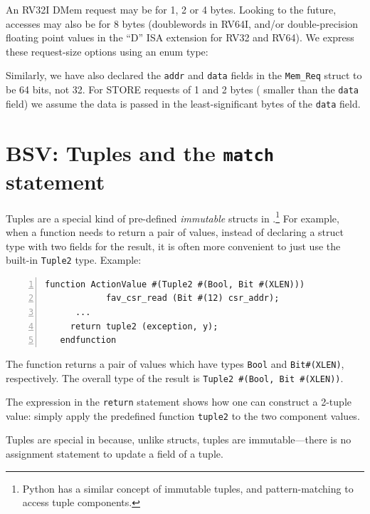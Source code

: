 An RV32I DMem request may be for 1, 2 or 4 bytes.  Looking to the
future, accesses may also be for 8 bytes (doublewords in RV64I, and/or
double-precision floating point values in the ``D'' ISA extension for
RV32 and RV64).  We express these request-size options using an enum
type:


Similarly, we have also declared the \verb|addr| and \verb|data|
fields in the \verb|Mem_Req| struct to be 64 bits, not 32.  For STORE
requests of 1 and 2 bytes ({\ie} smaller than the \verb|data| field)
we assume the data is passed in the least-significant bytes of the
\verb|data| field.


\section{BSV: Tuples and the {\tt match} statement}

\label{Sec_Tuples}


Tuples are a special kind of pre-defined \emph{immutable} structs in
{\BSV}.\footnote{
Python has a similar concept of immutable tuples, and pattern-matching
to access tuple components.
}
For example, when a function needs to return a pair of values, instead
of declaring a struct type with two fields for the result, it is often
more convenient to just use the built-in \verb|Tuple2| type.  Example:

{\footnotesize
\begin{Verbatim}[frame=single, numbers=left, label=in src\_Common/CSRs.bsv]
   function ActionValue #(Tuple2 #(Bool, Bit #(XLEN)))
            fav_csr_read (Bit #(12) csr_addr);
      ...
	 return tuple2 (exception, y);
   endfunction
\end{Verbatim}
}

The function returns a pair of values which have types \verb|Bool| and
\verb|Bit#(XLEN)|, respectively.  The overall type of the result is
\verb|Tuple2 #(Bool, Bit #(XLEN))|.

The expression in the \verb|return| statement shows how one can
construct a 2-tuple value: simply apply the predefined function
\verb|tuple2| to the two component values.

Tuples are special in {\BSV} because, unlike structs, tuples are
immutable---there is no assignment statement to update a field of a
tuple.

